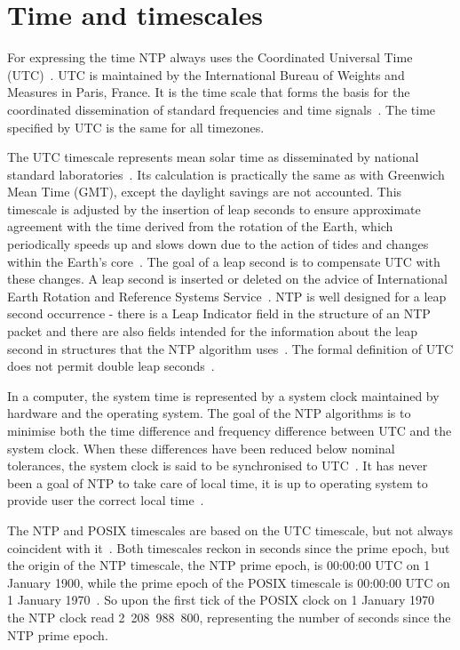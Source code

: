 
\section{Time and timescales}\label{sec:ntp-time}
For expressing the time NTP always uses the Coordinated Universal Time (UTC)~\cite{rfc5905}.
UTC is maintained by the International Bureau of Weights and Measures in Paris, France.
It is the time scale that forms the basis for the coordinated dissemination
of standard frequencies and time signals~\cite{bipm-utc}.
The time specified by UTC is the same for all timezones.

The UTC timescale represents mean solar time as disseminated by national
standard laboratories~\cite{rfc5905}.
Its calculation is practically the same as with Greenwich Mean Time (GMT),
except the daylight savings are not accounted.
This timescale is adjusted by the insertion of leap seconds to ensure approximate
agreement with the time derived from the rotation of the Earth,
which periodically speeds up and slows down due to the action
of tides and changes within the Earth's core~\cite{bipm-utc}.
The goal of a leap second is to compensate UTC with these changes.
A leap second is inserted or deleted on the advice of
International Earth Rotation and Reference Systems Service~\cite{bipm-utc}.
NTP is well designed for a leap second occurrence -
there is a Leap Indicator field
in the structure of an NTP packet and there are also fields intended for
the information about the leap second in structures that the NTP algorithm uses~\cite{rfc5905}.
The formal definition of UTC does not permit double leap seconds~\cite{posix}.

In a computer, the system time is represented by a system clock maintained by
hardware and the operating system.
The goal of the NTP algorithms is to minimise
both the time difference and frequency difference between UTC and the system clock.
When these differences have been reduced below nominal
tolerances, the system clock is said to be synchronised to UTC~\cite{rfc5905}.
It has never been a goal of NTP to take care of local time,
it is up to operating system to provide user the correct local time~\cite{ntp-overview}.

The NTP and POSIX timescales are based on the UTC timescale,
but not always coincident with it~\cite{ntp-leap}.
Both timescales reckon in seconds since the prime epoch,
but the origin of the NTP timescale, the NTP prime epoch, is 00:00:00 UTC on 1 January 1900,
while the prime epoch of the POSIX timescale is 00:00:00 UTC on 1 January 1970~\cite{ntp-leap}.
So upon the first tick of the POSIX clock on 1 January 1970 the NTP clock read 2~208~988~800,
representing the number of seconds since the NTP prime epoch.
